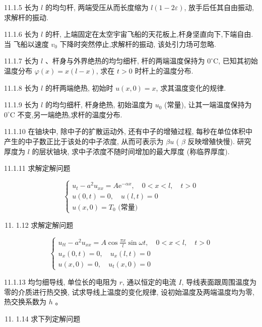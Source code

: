 11.1.5 长为 $l$ 的均匀杆, 两端受压从而长度缩为 $l(1-2 \varepsilon)$, 放手后任其自由振动, 求解杆的振动.

11.1.6 长为 $l$ 的杆, 上端固定在太空宇宙飞船的天花板上,杆身坚直向下,下端自由. 当
飞船以速度 $v_{0}$ 下降时突然停止,求解杆的振动, 该处引力场可忽略.

11.1.7 长为 $l$ 、杆身与外界绝热的均匀细杆, 杆的两端温度保持为 $0^{\circ} \mathrm{C}$, 已知其初始温度分布 $\varphi(x)=x(l-x)$, 求在 $t>0$ 时杆上的温度分布.

11.1.8 长为 $l$ 的杆两端绝热, 初始时 $u(x, 0)=x$, 求其温度变化的规律.

11.1.9 长为 $l$ 的均匀细杆, 杆身绝热, 初始温度为 $u_{0}$ (常量), 让其一端温度保持为 $0^{\circ} \mathrm{C}$ 不变,另一端绝热,求杆的温度分布.

11.1.10 在铀块中, 除中子的扩散运动外, 还有中子的增殖过程, 每秒在单位体积中产生的中子数正比于该处的中子浓度, 从而可表示为 $\beta u$ ( $\beta$ 反映增殖快慢). 研究厚度为 $l$ 的层状铀块, 求中子浓度不随时间增加的最大厚度 (称临界厚度).

11.1.11 求解定解问题

$$
\left\{\begin{array}{l}
u_{t}-a^{2} u_{x x}=A \mathrm{e}^{-\alpha x}, \quad 0<x<l, \quad t>0 \\
u(0, t)=0, \quad u(l, t)=0 \\
u(x, 0)=T_{0} \text { (常量) }
\end{array}\right.
$$

\begin{enumerate}
  \setcounter{enumi}{10}
  \item 1.12 求解定解问题
\end{enumerate}

$$
\left\{\begin{array}{l}
u_{t t}-a^{2} u_{x x}=A \cos \frac{\pi x}{l} \sin \omega t, \quad 0<x<l, \quad t>0 \\
u_{x}(0, t)=0, \quad u_{x}(l, t)=0 \\
u(x, 0)=0, \quad u_{t}(x, 0)=0
\end{array}\right.
$$

11.1.13 均匀细导线, 单位长的电阻为 $r$, 通以恒定的电流 $I$, 导线表面跟周围温度为零的介质进行热交换, 试求导线上温度的变化规律, 设初始温度及两端温度均为零, 热交换系数为 $h$ 。

\begin{enumerate}
  \setcounter{enumi}{10}
  \item 1.14 求下列定解问题
\end{enumerate}

